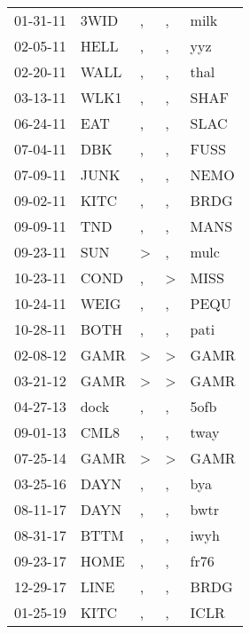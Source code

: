 \begin{supertabular}{lllll}
 01-31-11 &  3WID &             , &             , &  milk \\
 02-05-11 &  HELL &             , &             , &   yyz \\
 02-20-11 &  WALL &             , &             , &  thal \\
 03-13-11 &  WLK1 &             , &             , &  SHAF \\
 06-24-11 &   EAT &             , &             , &  SLAC \\
 07-04-11 &   DBK &             , &             , &  FUSS \\
 07-09-11 &  JUNK &             , &             , &  NEMO \\
 09-02-11 &  KITC &             , &             , &  BRDG \\
 09-09-11 &   TND &             , &             , &  MANS \\
 09-23-11 &   SUN &  \textgreater &             , &  mulc \\
 10-23-11 &  COND &             , &  \textgreater &  MISS \\
 10-24-11 &  WEIG &             , &             , &  PEQU \\
 10-28-11 &  BOTH &             , &             , &  pati \\
 02-08-12 &  GAMR &  \textgreater &  \textgreater &  GAMR \\
 03-21-12 &  GAMR &  \textgreater &  \textgreater &  GAMR \\
 04-27-13 &  dock &             , &             , &  5ofb \\
 09-01-13 &  CML8 &             , &             , &  tway \\
 07-25-14 &  GAMR &  \textgreater &  \textgreater &  GAMR \\
 03-25-16 &  DAYN &             , &             , &   bya \\
 08-11-17 &  DAYN &             , &             , &  bwtr \\
 08-31-17 &  BTTM &             , &             , &  iwyh \\
 09-23-17 &  HOME &             , &             , &  fr76 \\
 12-29-17 &  LINE &             , &             , &  BRDG \\
 01-25-19 &  KITC &             , &             , &  ICLR \\
\end{supertabular}
